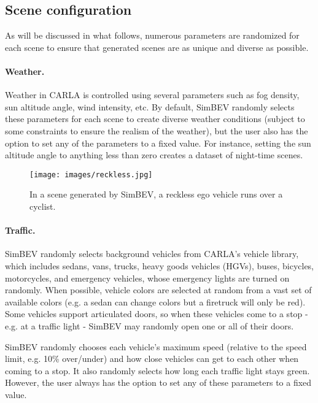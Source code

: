 \subsection{Scene configuration} \label{subsec:simbev-config}

As will be discussed in what follows, numerous parameters are randomized for each scene to ensure that generated scenes are as unique and diverse as possible.

\paragraph{Weather.} \label{par:weather}

Weather in CARLA is controlled using several parameters such as fog density, sun altitude angle, wind intensity, etc. By default, SimBEV randomly selects these parameters for each scene to create diverse weather conditions (subject to some constraints to ensure the realism of the weather), but the user also has the option to set any of the parameters to a fixed value. For instance, setting the sun altitude angle to anything less than zero creates a dataset of night-time scenes.

\begin{figure}[t]
    \centering
    \texttt{[image: images/reckless.jpg]}
    \setlength{\abovecaptionskip}{-8 pt}
    \setlength{\belowcaptionskip}{-8 pt}
    \caption{In a scene generated by SimBEV, a reckless ego vehicle runs over a cyclist.}\label{fig:reckless}
\end{figure}

\paragraph{Traffic.} \label{par:traffic}

SimBEV randomly selects background vehicles from CARLA's vehicle library, which includes sedans, vans, trucks, heavy goods vehicles (HGVs), buses, bicycles, motorcycles, and emergency vehicles, whose emergency lights are turned on randomly. When possible, vehicle colors are selected at random from a vast set of available colors (e.g. a sedan can change colors but a firetruck will only be red). Some vehicles support articulated doors, so when these vehicles come to a stop - e.g. at a traffic light - SimBEV may randomly open one or all of their doors.

SimBEV randomly chooses each vehicle's maximum speed (relative to the speed limit, e.g. 10\% over/under) and how close vehicles can get to each other when coming to a stop. It also randomly selects how long each traffic light stays green. However, the user always has the option to set any of these parameters to a fixed value.

